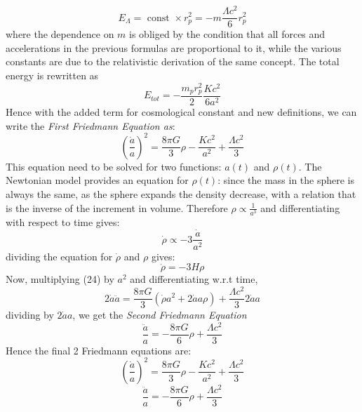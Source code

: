 \documentclass[14pt]{extarticle}
\begin{document}
\begin{equation}
E_{\Lambda}=\text { const } \times r_{p}^{2}=-m \frac{\Lambda c^{2}}{6} r_{p}^{2}
\end{equation}
where the dependence on $m$ is obliged by the condition that all forces and accelerations in the previous formulas are proportional to it, while the various constants are due to the relativistic derivation of the same concept. The total energy is rewritten as \\
\begin{equation}
E_{t o t}=-\frac{m_{p} r_{p}^{2}}{2} \frac{K c^{2}}{6 a^{2}}
\end{equation}
Hence with the added term for cosmological constant and new definitions, we can write the \textit{First Friedmann Equation as}:\\
\begin{equation}
\left(\frac{\dot{a}}{a}\right)^{2}=\frac{8 \pi G}{3} \rho-\frac{K c^{2}}{a^{2}}+\frac{\Lambda c^{2}}{3}
\end{equation}
This equation need to be solved for two functions: $a(t)$ and $\rho(t)$. The Newtonian model provides an equation for $\rho(t)$: since the mass in the sphere is always the same, as the sphere expands the density decrease, with a relation that is the inverse of the increment in volume. Therefore 
$\rho \propto \frac{1}{a^{3}}$ and differentiating  with respect to time gives:\\
\begin{equation}
\dot{\rho} \propto-3 \frac{\dot{a}}{a^{2}}
\end{equation}
dividing the equation for $\dot{\rho}$ and $\rho$ gives:\\
\begin{equation}
\dot{\rho}=-3 H \rho
\end{equation}
Now, multiplying (24) by $a^2$ and differentiating w.r.t time, \\
\begin{equation*}
2\dot{a}\ddot{a}=\frac{8 \pi G}{3}\left(\dot{\rho}a^{2}+ 2\dot{a}a \rho\right)+\frac{\Lambda c^{2}}{3} 2\dot{a}a
\end{equation*}
dividing by $2\dot{a}a$, we get the \textit{Second Friedmann Equation} \\
\begin{equation}
\frac{\ddot{a}}{a}=-\frac{8 \pi G}{6} \rho+\frac{\Lambda c^{2}}{3}
\end{equation}
Hence the final 2 Friedmann equations are:\\
\begin{equation}
\left(\frac{\dot{a}}{a}\right)^{2}=\frac{8 \pi G}{3} \rho-\frac{K c^{2}}{a^{2}}+\frac{\Lambda c^{2}}{3}
\end{equation}
\begin{equation}
\frac{\ddot{a}}{a}=-\frac{8 \pi G}{6} \rho+\frac{\Lambda c^{2}}{3}
\end{equation} \\ 
\end{document}
